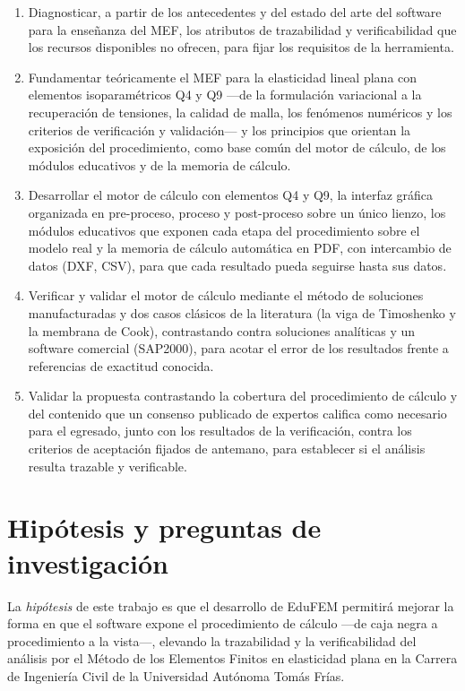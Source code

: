 \begin{enumerate}
    \item Diagnosticar, a partir de los antecedentes y del estado del arte del software para la enseñanza del MEF, los atributos de trazabilidad y verificabilidad que los recursos disponibles no ofrecen, para fijar los requisitos de la herramienta.
    \item Fundamentar teóricamente el MEF para la elasticidad lineal plana con elementos isoparamétricos Q4 y Q9 —de la formulación variacional a la recuperación de tensiones, la calidad de malla, los fenómenos numéricos y los criterios de verificación y validación— y los principios que orientan la exposición del procedimiento, como base común del motor de cálculo, de los módulos educativos y de la memoria de cálculo.
    \item Desarrollar el motor de cálculo con elementos Q4 y Q9, la interfaz gráfica organizada en pre-proceso, proceso y post-proceso sobre un único lienzo, los módulos educativos que exponen cada etapa del procedimiento sobre el modelo real y la memoria de cálculo automática en PDF, con intercambio de datos (DXF, CSV), para que cada resultado pueda seguirse hasta sus datos.
    \item Verificar y validar el motor de cálculo mediante el método de soluciones manufacturadas y dos casos clásicos de la literatura (la viga de Timoshenko y la membrana de Cook), contrastando contra soluciones analíticas y un software comercial (SAP2000), para acotar el error de los resultados frente a referencias de exactitud conocida.
    \item Validar la propuesta contrastando la cobertura del procedimiento de cálculo y del contenido que un consenso publicado de expertos califica como necesario para el egresado, junto con los resultados de la verificación, contra los criterios de aceptación fijados de antemano, para establecer si el análisis resulta trazable y verificable.
\end{enumerate}

\section*{Hipótesis y preguntas de investigación}

La \emph{hipótesis} de este trabajo es que el desarrollo de EduFEM permitirá mejorar la forma en que el software expone el procedimiento de cálculo —de caja negra a procedimiento a la vista—, elevando la trazabilidad y la verificabilidad del análisis por el Método de los Elementos Finitos en elasticidad plana en la Carrera de Ingeniería Civil de la Universidad Autónoma Tomás Frías.

